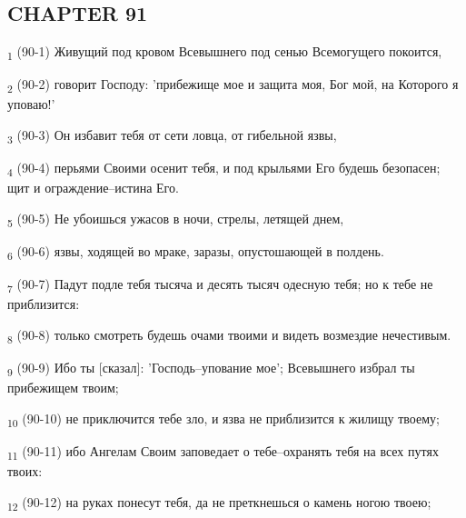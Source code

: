 \subsection{CHAPTER 91}
\begin{tcolorbox}
\textsubscript{1} (90-1) Живущий под кровом Всевышнего под сенью Всемогущего покоится,
\end{tcolorbox}
\begin{tcolorbox}
\textsubscript{2} (90-2) говорит Господу: 'прибежище мое и защита моя, Бог мой, на Которого я уповаю!'
\end{tcolorbox}
\begin{tcolorbox}
\textsubscript{3} (90-3) Он избавит тебя от сети ловца, от гибельной язвы,
\end{tcolorbox}
\begin{tcolorbox}
\textsubscript{4} (90-4) перьями Своими осенит тебя, и под крыльями Его будешь безопасен; щит и ограждение--истина Его.
\end{tcolorbox}
\begin{tcolorbox}
\textsubscript{5} (90-5) Не убоишься ужасов в ночи, стрелы, летящей днем,
\end{tcolorbox}
\begin{tcolorbox}
\textsubscript{6} (90-6) язвы, ходящей во мраке, заразы, опустошающей в полдень.
\end{tcolorbox}
\begin{tcolorbox}
\textsubscript{7} (90-7) Падут подле тебя тысяча и десять тысяч одесную тебя; но к тебе не приблизится:
\end{tcolorbox}
\begin{tcolorbox}
\textsubscript{8} (90-8) только смотреть будешь очами твоими и видеть возмездие нечестивым.
\end{tcolorbox}
\begin{tcolorbox}
\textsubscript{9} (90-9) Ибо ты [сказал]: 'Господь--упование мое'; Всевышнего избрал ты прибежищем твоим;
\end{tcolorbox}
\begin{tcolorbox}
\textsubscript{10} (90-10) не приключится тебе зло, и язва не приблизится к жилищу твоему;
\end{tcolorbox}
\begin{tcolorbox}
\textsubscript{11} (90-11) ибо Ангелам Своим заповедает о тебе--охранять тебя на всех путях твоих:
\end{tcolorbox}
\begin{tcolorbox}
\textsubscript{12} (90-12) на руках понесут тебя, да не преткнешься о камень ногою твоею;
\end{tcolorbox}
